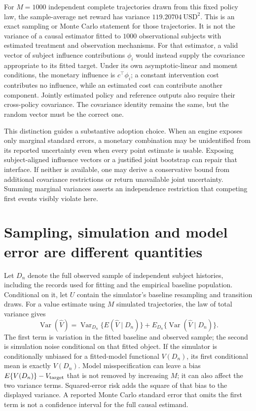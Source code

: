For $M=1000$ independent complete trajectories drawn from this fixed policy
law, the sample-average net reward has variance $119.20704\ \mathrm{USD}^2$.
This is an exact sampling or Monte Carlo statement for those trajectories.
It is not the variance of a causal estimator fitted to $1000$ observational
subjects with estimated treatment and observation mechanisms. For that
estimator, a valid vector of subject influence contributions $\phi_i$ would
instead supply the covariance appropriate to its fitted target. Under its
own asymptotic-linear and moment conditions, the monetary influence is
$c^\top\phi_i$; a constant intervention cost contributes no influence, while
an estimated cost can contribute another component. Jointly estimated
policy and reference outputs also require their cross-policy covariance.
The covariance identity remains the same, but the random vector must be the
correct one.~\citep{exec17_s5_joint_error}

This distinction guides a substantive adoption choice. When an engine exposes
only marginal standard errors, a monetary combination may be unidentified
from its reported uncertainty even when every point estimate is usable.
Exposing subject-aligned influence vectors or a justified joint bootstrap
can repair that interface. If neither is available, one may derive a
conservative bound from additional covariance restrictions or return
unavailable joint uncertainty. Summing marginal variances asserts an
independence restriction that competing first events visibly violate here.

\section{Sampling, simulation and model error are different quantities}
\label{exec17:s5-uncertainty}

Let $D_n$ denote the full observed sample of independent subject histories,
including the records used for fitting and the empirical baseline population.
Conditional on it, let $U$ contain the simulator's baseline resampling and
transition draws. For a value estimate using $M$ simulated trajectories,
the law of total variance gives
\begin{equation}
 \operatorname{Var}(\widehat V)=
 \operatorname{Var}_{D_n}\{E(\widehat V\mid D_n)\}+
 E_{D_n}\{\operatorname{Var}(\widehat V\mid D_n)\}.
 \label{exec17:s5-total-variance}
\end{equation}
The first term is variation in the fitted baseline and observed sample; the
second is simulation noise conditional on that fitted object. If the simulator
is conditionally unbiased for a fitted-model functional $V(D_n)$, its first
conditional mean is exactly $V(D_n)$. Model misspecification can leave a
bias $E\{V(D_n)\}-V_{\rm target}$ that is not removed by increasing $M$; it
can also affect the two variance terms. Squared-error risk adds the square
of that bias to the displayed variance. A
reported Monte Carlo standard error that omits the first term is not a
confidence interval for the full causal estimand.

